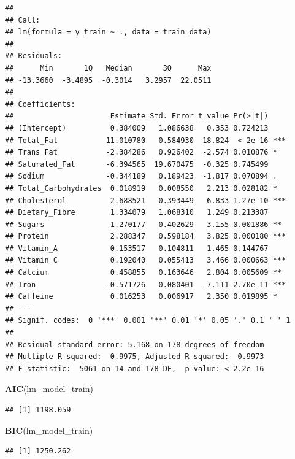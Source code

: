 \documentclass[
]{article}
\newenvironment{Shaded}{\begin{snugshade}}{\end{snugshade}}
\newcommand{\FunctionTok}[1]{\textcolor[rgb]{0.13,0.29,0.53}{\textbf{#1}}}
\newcommand{\NormalTok}[1]{#1}
\begin{document}
\begin{verbatim}
## 
## Call:
## lm(formula = y_train ~ ., data = train_data)
## 
## Residuals:
##      Min       1Q   Median       3Q      Max 
## -13.3660  -3.4895  -0.3014   3.2957  22.0511 
## 
## Coefficients:
##                      Estimate Std. Error t value Pr(>|t|)    
## (Intercept)          0.384009   1.086638   0.353 0.724213    
## Total_Fat           11.010780   0.584930  18.824  < 2e-16 ***
## Trans_Fat           -2.384286   0.926402  -2.574 0.010876 *  
## Saturated_Fat       -6.394565  19.670475  -0.325 0.745499    
## Sodium              -0.344189   0.189423  -1.817 0.070894 .  
## Total_Carbohydrates  0.018919   0.008550   2.213 0.028182 *  
## Cholesterol          2.688521   0.393449   6.833 1.27e-10 ***
## Dietary_Fibre        1.334079   1.068310   1.249 0.213387    
## Sugars               1.270177   0.402629   3.155 0.001886 ** 
## Protein              2.288347   0.598184   3.825 0.000180 ***
## Vitamin_A            0.153517   0.104811   1.465 0.144767    
## Vitamin_C            0.192040   0.055413   3.466 0.000663 ***
## Calcium              0.458855   0.163646   2.804 0.005609 ** 
## Iron                -0.571726   0.080401  -7.111 2.70e-11 ***
## Caffeine             0.016253   0.006917   2.350 0.019895 *  
## ---
## Signif. codes:  0 '***' 0.001 '**' 0.01 '*' 0.05 '.' 0.1 ' ' 1
## 
## Residual standard error: 5.168 on 178 degrees of freedom
## Multiple R-squared:  0.9975, Adjusted R-squared:  0.9973 
## F-statistic:  5061 on 14 and 178 DF,  p-value: < 2.2e-16
\end{verbatim}

\begin{Shaded}
\begin{Highlighting}[]
\FunctionTok{AIC}\NormalTok{(lm\_model\_train)}
\end{Highlighting}
\end{Shaded}

\begin{verbatim}
## [1] 1198.059
\end{verbatim}

\begin{Shaded}
\begin{Highlighting}[]
\FunctionTok{BIC}\NormalTok{(lm\_model\_train)}
\end{Highlighting}
\end{Shaded}

\begin{verbatim}
## [1] 1250.262
\end{verbatim}
\end{document}
